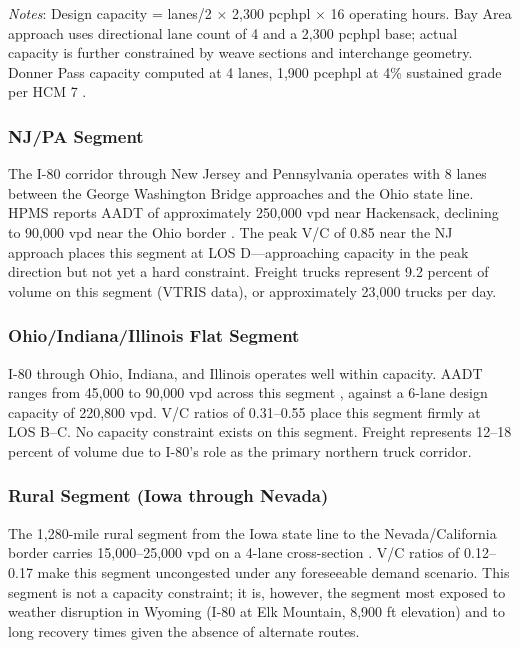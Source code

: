 \noindent\textit{Notes}: Design capacity = lanes/2 $\times$ 2,300 pcphpl $\times$ 16 operating hours. Bay Area approach uses directional lane count of 4 and a 2,300 pcphpl base; actual capacity is further constrained by weave sections and interchange geometry. Donner Pass capacity computed at 4 lanes, 1,900 pcephpl at 4\% sustained grade per HCM 7 \citep{HCM7}.

\subsubsection{NJ/PA Segment}

The I-80 corridor through New Jersey and Pennsylvania operates with 8 lanes between the George Washington Bridge approaches and the Ohio state line. HPMS reports AADT of approximately 250,000 vpd near Hackensack, declining to 90,000 vpd near the Ohio border \citep{HPMS2018}. The peak V/C of 0.85 near the NJ approach places this segment at LOS D---approaching capacity in the peak direction but not yet a hard constraint. Freight trucks represent 9.2 percent of volume on this segment (VTRIS data), or approximately 23,000 trucks per day.

\subsubsection{Ohio/Indiana/Illinois Flat Segment}

I-80 through Ohio, Indiana, and Illinois operates well within capacity. AADT ranges from 45,000 to 90,000 vpd across this segment \citep{HPMS2018}, against a 6-lane design capacity of 220,800 vpd. V/C ratios of 0.31--0.55 place this segment firmly at LOS B--C. No capacity constraint exists on this segment. Freight represents 12--18 percent of volume due to I-80's role as the primary northern truck corridor.

\subsubsection{Rural Segment (Iowa through Nevada)}

The 1,280-mile rural segment from the Iowa state line to the Nevada/California border carries 15,000--25,000 vpd on a 4-lane cross-section \citep{HPMS2018}. V/C ratios of 0.12--0.17 make this segment uncongested under any foreseeable demand scenario. This segment is not a capacity constraint; it is, however, the segment most exposed to weather disruption in Wyoming (I-80 at Elk Mountain, 8,900 ft elevation) and to long recovery times given the absence of alternate routes.

